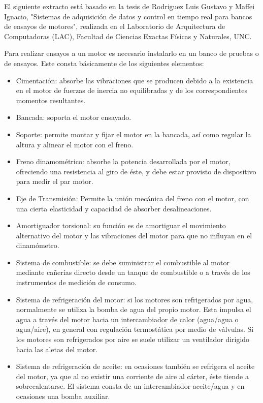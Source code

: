 El siguiente extracto está basado en la tesis de Rodriguez Luis Gustavo y Maffei Ignacio, "Sistemas de adquisición de datos y control en tiempo real para bancos de ensayos de motores", realizada en el Laboratorio de Arquitectura de Computadoras (LAC), Facultad de Ciencias Exactas Físicas y Naturales, UNC.

Para realizar ensayos a un motor es necesario instalarlo en un banco de pruebas o de ensayos. Este consta básicamente de los siguientes elementos:

\begin{itemize}
\item Cimentación: absorbe las vibraciones que se producen debido a la existencia en el motor de fuerzas de inercia no equilibradas y de los correspondientes momentos resultantes.
\item Bancada: soporta el motor ensayado.
\item Soporte: permite montar y fijar el motor en la bancada, así como regular la altura y alinear el motor con el freno.
\item Freno dinamométrico: absorbe la potencia desarrollada por el motor, ofreciendo una resistencia al giro de éste, y debe estar provisto de dispositivo para medir el par motor.
\item Eje de Transmisión: Permite la unión mecánica del freno con el motor, con una cierta elasticidad y capacidad de absorber desalineaciones.
\item Amortiguador torsional: su función es de amortiguar el movimiento alternativo del motor y las vibraciones del motor para que no influyan en el dinamómetro.
\item Sistema de combustible: se debe suministrar el combustible al motor mediante cañerías directo desde un tanque de combustible o a través de los instrumentos de medición de consumo.
\item Sistema de refrigeración del motor: si los motores son refrigerados por agua, normalmente se utiliza la bomba de agua del propio motor. Esta impulsa el agua a través del motor hacia un intercambiador de calor (agua/agua o agua/aire), en general con regulación termostática por medio de válvulas.
Si los motores son refrigerados por aire se suele utilizar un ventilador dirigido hacia las aletas del motor.
\item Sistema de refrigeración de aceite: en ocasiones también se refrigera el aceite del motor, ya que al no existir una corriente de aire al cárter, éste tiende a sobrecalentarse. El sistema consta de un intercambiador aceite/agua y en ocasiones una bomba auxiliar.

\end{itemize}
